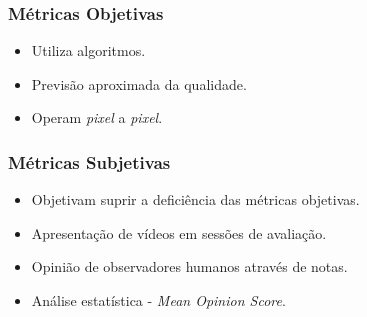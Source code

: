     \begin{frame}\frametitle{Métricas Objetivas}
        \begin{itemize}
            \item Utiliza algoritmos.
            \item Previsão aproximada da qualidade.
            \item Operam \emph{pixel} a \emph{pixel}.
        \end{itemize}
    \end{frame}
    
    \begin{frame}\frametitle{Métricas Subjetivas}
        \begin{itemize}
            \item Objetivam suprir a deficiência das métricas objetivas.
            \item Apresentação de vídeos em sessões de avaliação.
            \item Opinião de observadores humanos através de notas.
            \item Análise estatística - \emph{Mean Opinion Score}.
        \end{itemize}
    \end{frame}

